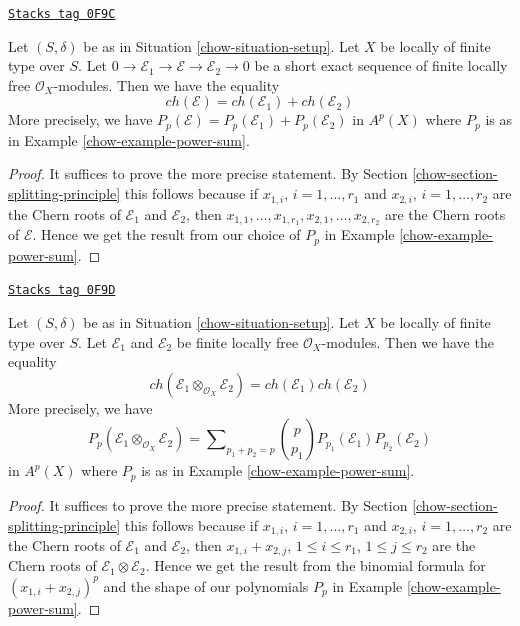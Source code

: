 \begin{lemma}
\label{chow-lemma-chern-character-additive}
\href{https://stacks.math.columbia.edu/tag/0F9C}{\texttt{Stacks tag 0F9C}}

Let $(S, \delta)$ be as in Situation \ref{chow-situation-setup}. Let $X$ be locally
of finite type over $S$. Let
$
0 \to \mathcal{E}_1 \to \mathcal{E} \to \mathcal{E}_2 \to 0
$
be a short exact sequence of finite locally free $\mathcal{O}_X$-modules.
Then we have the equality
$$
ch(\mathcal{E}) = ch(\mathcal{E}_1) + ch(\mathcal{E}_2)
$$
More precisely, we have
$P_p(\mathcal{E}) = P_p(\mathcal{E}_1) + P_p(\mathcal{E}_2)$
in $A^p(X)$ where $P_p$ is as in Example \ref{chow-example-power-sum}.
\end{lemma}

\begin{proof}

It suffices to prove the more precise statement. By
Section \ref{chow-section-splitting-principle}
this follows because if $x_{1, i}$, $i = 1, \ldots, r_1$
and $x_{2, i}$, $i = 1, \ldots, r_2$ are the
Chern roots of $\mathcal{E}_1$ and $\mathcal{E}_2$, then
$x_{1, 1}, \ldots, x_{1, r_1}, x_{2, 1}, \ldots, x_{2, r_2}$
are the Chern roots of $\mathcal{E}$. Hence we get the result
from our choice of $P_p$ in Example \ref{chow-example-power-sum}.
\end{proof}

\begin{lemma}
\label{chow-lemma-chern-character-multiplicative}
\href{https://stacks.math.columbia.edu/tag/0F9D}{\texttt{Stacks tag 0F9D}}

Let $(S, \delta)$ be as in Situation \ref{chow-situation-setup}. Let $X$ be locally
of finite type over $S$. Let $\mathcal{E}_1$ and $\mathcal{E}_2$
be finite locally free $\mathcal{O}_X$-modules.
Then we have the equality
$$
ch(\mathcal{E}_1 \otimes_{\mathcal{O}_X} \mathcal{E}_2) =
ch(\mathcal{E}_1) ch(\mathcal{E}_2)
$$
More precisely, we have
$$
P_p(\mathcal{E}_1 \otimes_{\mathcal{O}_X} \mathcal{E}_2) =
\sum\nolimits_{p_1 + p_2 = p}
{p \choose p_1} P_{p_1}(\mathcal{E}_1) P_{p_2}(\mathcal{E}_2)
$$
in $A^p(X)$ where $P_p$ is as in Example \ref{chow-example-power-sum}.
\end{lemma}

\begin{proof}

It suffices to prove the more precise statement. By
Section \ref{chow-section-splitting-principle}
this follows because if $x_{1, i}$, $i = 1, \ldots, r_1$
and $x_{2, i}$, $i = 1, \ldots, r_2$ are the
Chern roots of $\mathcal{E}_1$ and $\mathcal{E}_2$, then
$x_{1, i} + x_{2, j}$, $1 \leq i \leq r_1$, $1 \leq j \leq r_2$
are the Chern roots of $\mathcal{E}_1 \otimes \mathcal{E}_2$.
Hence we get the result from the binomial formula for
$(x_{1, i} + x_{2, j})^p$ and the
shape of our polynomials $P_p$ in Example \ref{chow-example-power-sum}.
\end{proof}

